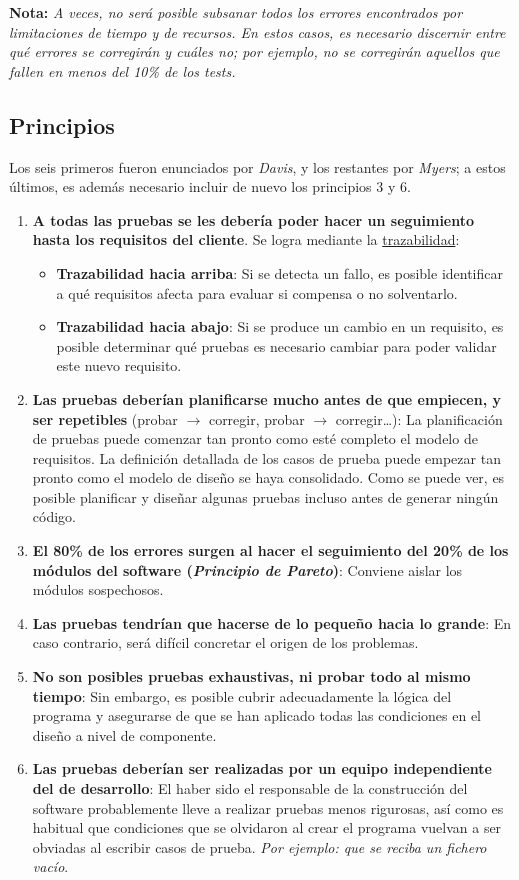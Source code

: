 \textbf{Nota:} \textit{A veces, no será posible subsanar todos los errores encontrados por limitaciones de tiempo y de recursos. En estos casos, es necesario discernir entre qué errores se corregirán y cuáles no; por ejemplo, no se corregirán aquellos que fallen en menos del 10\% de los tests.}

\subsection{Principios}

Los seis primeros fueron enunciados por \textit{Davis}, y los restantes por \textit{Myers}; a estos últimos, es además necesario incluir de nuevo los principios 3 y 6.

\begin{enumerate}
    \item \textbf{A todas las pruebas se les debería poder hacer un seguimiento hasta los requisitos del cliente}. Se logra mediante la \uline{trazabilidad}:
    \begin{itemize}
        \item \textbf{Trazabilidad hacia arriba}: Si se detecta un fallo, es posible identificar a qué requisitos afecta para evaluar si compensa o no solventarlo.
        \item \textbf{Trazabilidad hacia abajo}: Si se produce un cambio en un requisito, es posible determinar qué pruebas es necesario cambiar para poder validar este nuevo requisito.
    \end{itemize}
    \item \textbf{Las pruebas deberían planificarse mucho antes de que empiecen, y ser repetibles} (probar $\rightarrow$ corregir, probar $\rightarrow$ corregir\ldots): La planificación de pruebas puede comenzar tan pronto como esté completo el modelo de requisitos. La definición detallada de los casos de prueba puede empezar tan pronto como el modelo de diseño se haya consolidado. Como se puede ver, es posible planificar y diseñar algunas pruebas incluso antes de generar ningún código.
    \item \textbf{El 80\% de los errores surgen al hacer el seguimiento del 20\% de los módulos del software (\textit{Principio de Pareto})}: Conviene aislar los módulos sospechosos.
    \item \textbf{Las pruebas tendrían que hacerse de lo pequeño hacia lo grande}: En caso contrario, será difícil concretar el origen de los problemas.
    \item \textbf{No son posibles pruebas exhaustivas, ni probar todo al mismo tiempo}: Sin embargo, es posible cubrir adecuadamente la lógica del programa y asegurarse de que se han aplicado todas las condiciones en el diseño a nivel de componente.
    \item \textbf{Las pruebas deberían ser realizadas por un equipo independiente del de desarrollo}: El haber sido el responsable de la construcción del software probablemente lleve a realizar pruebas menos rigurosas, así como es habitual que condiciones que se olvidaron al crear el programa vuelvan a ser obviadas al escribir casos de prueba. \textit{Por ejemplo: que se reciba un fichero vacío}.\\
    


\end{enumerate}
